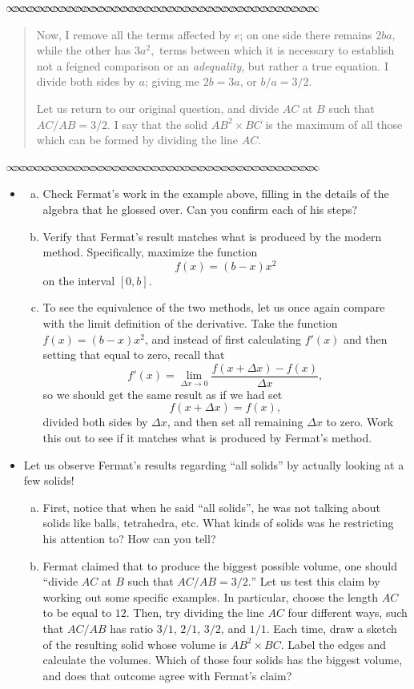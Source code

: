 \documentclass[11pt]{article}
\newcommand{\sep}{\vspace{-3pt}
\begin{center}
{\mathversion{normal}
$\infty \mspace{-5.5mu}\infty \mspace{-5.5mu}\infty \mspace{-5.5mu}\infty \mspace{-5.5mu}
\infty \mspace{-5.5mu}\infty \mspace{-5.5mu}\infty \mspace{-5.5mu}\infty \mspace{-5.5mu}
\infty \mspace{-5.5mu}\infty \mspace{-5.5mu}\infty \mspace{-5.5mu}\infty \mspace{-5.5mu}
\infty \mspace{-5.5mu}\infty \mspace{-5.5mu}\infty \mspace{-5.5mu}\infty \mspace{-5.5mu}
\infty \mspace{-5.5mu}\infty \mspace{-5.5mu}\infty \mspace{-5.5mu}\infty \mspace{-5.5mu}
\infty \mspace{-5.5mu}\infty \mspace{-5.5mu}\infty \mspace{-5.5mu}\infty \mspace{-5.5mu}
\infty \mspace{-5.5mu}\infty \mspace{-5.5mu}\infty \mspace{-5.5mu}\infty \mspace{-5.5mu}
\infty \mspace{-5.5mu}\infty \mspace{-5.5mu}\infty \mspace{-5.5mu}\infty \mspace{-5.5mu}
\infty \mspace{-5.5mu}\infty \mspace{-5.5mu}\infty \mspace{-5.5mu}\infty \mspace{-5.5mu}
\infty \mspace{-5.5mu}\infty \mspace{-5.5mu}\infty \mspace{-5.5mu}\infty \mspace{-5.5mu}$}
\end{center} \vspace*{-5pt}}
\newenvironment{source}%
 {\bigskip \sep \vspace*{-6pt} \begin{quote}
          \begin{sf}   }
   {   \end{sf}     \end{quote} \vspace*{-6pt} \sep \bigskip}%
\newcounter{tasknumb}
\newcommand{\tasknumb}[1]{\refstepcounter{tasknumb}\textmd{\textbf{$\fbox{$\fbox{Task \thetasknumb}$}$}}#1}
\newenvironment{task}[1][]%
 {\begin{itemize}
 \item[\tasknumb{#1}]  }
{
    \end{itemize}    }%
\begin{document}
\begin{source}
Now, I remove all the terms affected by $e$; on one side there remains $2ba,$ while the other has $3a^2,$ terms between which it is necessary to establish not a feigned comparison or an \emph{adequality}, but rather a true equation.  I divide both sides by $a$; giving me $2b=3a$, or $b/a=3/2.$

Let us return to our original question, and divide $AC$ at $B$ such that $AC/AB=3/2.$  I say that the solid $AB^2\times BC$ is the maximum of all those which can be formed by dividing the line $AC$.
\end{source}

\begin{task}
\begin{enumerate}[(a)]
    \item Check Fermat's work in the example above, filling in the details of the algebra that he glossed over.  Can you confirm each of his steps?  

\item Verify that Fermat's result matches what is produced by the modern method.  Specifically, maximize the function $$f(x)=(b-x)x^2$$ on the interval $[0,b]$.

\item To see the equivalence of the two methods, let us once again compare with the limit definition of the derivative.  Take the function $f(x)=(b-x)x^2$, and instead of first calculating $f'(x)$ and then setting that equal to zero, recall that $$f'(x)=\lim_{\Delta x \to 0} \frac{f(x+\Delta x)-f(x)}{\Delta x},$$ so we should get the same result as if we had set $$f(x+\Delta x)=f(x),$$ divided both sides by $\Delta x$, and then set all remaining $\Delta x$ to zero.  Work this out to see if it matches what is produced by Fermat's method.  
\end{enumerate}
\end{task}


\newpage
\begin{task} Let us observe Fermat's results regarding ``{\sf all solids}'' by actually looking at a few solids!
\begin{enumerate}[(a)]
    \item First, notice that when he said ``{\sf all solids}'', he was not talking about solids like balls, tetrahedra, etc.  What kinds of solids was he restricting his attention to?  How can you tell?
    \item Fermat claimed that to produce the biggest possible volume, one should ``{\sf divide $AC$ at $B$ such that $AC/AB=3/2.$}''  Let us test this claim by working out some specific examples.  In particular, choose the length $AC$ to be equal to $12$.  Then, try dividing the line $AC$ four different ways, such that $AC/AB$ has ratio $3/1$, $2/1$, $3/2$, and $1/1$.  Each time, draw a sketch of the resulting solid whose volume is $AB^2 \times BC$.  Label the edges and calculate the volumes.  Which of those four solids has the biggest volume, and does that outcome agree with Fermat's claim?
\end{enumerate}
\end{task}
\end{document}
